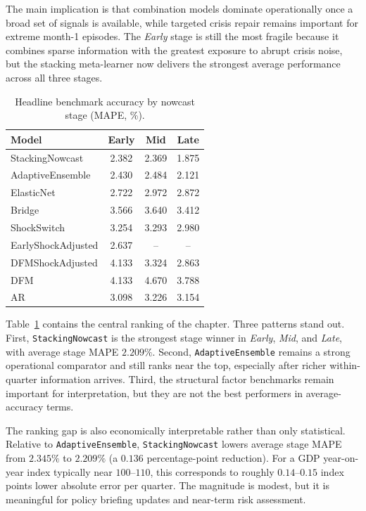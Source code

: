 \documentclass[12pt,a4paper]{report}
\begin{document}
The main implication is that combination models dominate operationally once a broad set of signals is available, while targeted crisis repair remains important for extreme month-1 episodes. The \textit{Early} stage is still the most fragile because it combines sparse information with the greatest exposure to abrupt crisis noise, but the stacking meta-learner now delivers the strongest average performance across all three stages.

\begin{table}[H]
    \centering
    \caption{Headline benchmark accuracy by nowcast stage (MAPE, \%).}
    \label{tab:headline_accuracy}
    \begin{tabular}{lccc}
        \hline
        Model & Early & Mid & Late \\
        \hline
        StackingNowcast & 2.382 & 2.369 & 1.875 \\
        AdaptiveEnsemble & 2.430 & 2.484 & 2.121 \\
        ElasticNet & 2.722 & 2.972 & 2.872 \\
        Bridge & 3.566 & 3.640 & 3.412 \\
        ShockSwitch & 3.254 & 3.293 & 2.980 \\
        EarlyShockAdjusted & 2.637 & -- & -- \\
        DFMShockAdjusted & 4.133 & 3.324 & 2.863 \\
        DFM & 4.133 & 4.670 & 3.788 \\
        AR & 3.098 & 3.226 & 3.154 \\
        \hline
    \end{tabular}
\end{table}

Table~\ref{tab:headline_accuracy} contains the central ranking of the chapter. Three patterns stand out. First, \texttt{StackingNowcast} is the strongest stage winner in \textit{Early}, \textit{Mid}, and \textit{Late}, with average stage MAPE $2.209\%$. Second, \texttt{AdaptiveEnsemble} remains a strong operational comparator and still ranks near the top, especially after richer within-quarter information arrives. Third, the structural factor benchmarks remain important for interpretation, but they are not the best performers in average-accuracy terms.

The ranking gap is also economically interpretable rather than only statistical. Relative to \texttt{AdaptiveEnsemble}, \texttt{StackingNowcast} lowers average stage MAPE from $2.345\%$ to $2.209\%$ (a $0.136$ percentage-point reduction). For a GDP year-on-year index typically near $100$--$110$, this corresponds to roughly $0.14$--$0.15$ index points lower absolute error per quarter. The magnitude is modest, but it is meaningful for policy briefing updates and near-term risk assessment.
\end{document}
